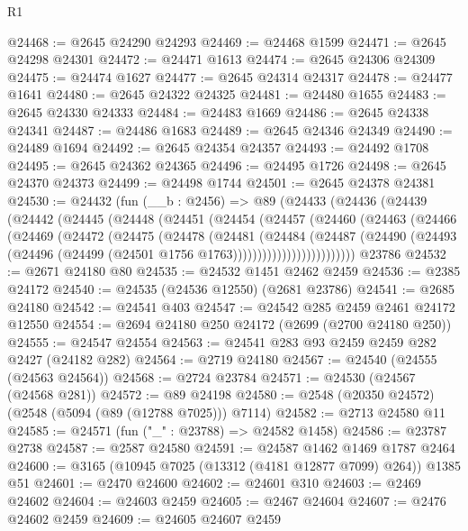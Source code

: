 \begin{lexlean}{R1}
\begin{coremodule}
@24468 := @2645 @24290 @24293
@24469 := @24468 @1599
@24471 := @2645 @24298 @24301
@24472 := @24471 @1613
@24474 := @2645 @24306 @24309
@24475 := @24474 @1627
@24477 := @2645 @24314 @24317
@24478 := @24477 @1641
@24480 := @2645 @24322 @24325
@24481 := @24480 @1655
@24483 := @2645 @24330 @24333
@24484 := @24483 @1669
@24486 := @2645 @24338 @24341
@24487 := @24486 @1683
@24489 := @2645 @24346 @24349
@24490 := @24489 @1694
@24492 := @2645 @24354 @24357
@24493 := @24492 @1708
@24495 := @2645 @24362 @24365
@24496 := @24495 @1726
@24498 := @2645 @24370 @24373
@24499 := @24498 @1744
@24501 := @2645 @24378 @24381
@24530 := @24432
    (fun (__b : @2456) =>
    @89
      (@24433
        (@24436
          (@24439
            (@24442
              (@24445
                (@24448
                  (@24451
                    (@24454
                      (@24457
                        (@24460
                          (@24463
                            (@24466
                              (@24469
                                (@24472
                                  (@24475
                                    (@24478
                                      (@24481
                                        (@24484
                                          (@24487
                                            (@24490
                                              (@24493
                                                (@24496
                                                  (@24499
                                                    (@24501 @1756 @1763)))))))))))))))))))))))))
    @23786
@24532 := @2671 @24180 @80
@24535 := @24532 @1451 @2462 @2459
@24536 := @2385 @24172
@24540 := @24535 (@24536 @12550) (@2681 @23786)
@24541 := @2685 @24180
@24542 := @24541 @403
@24547 := @24542 @285 @2459 @2461 @24172 @12550
@24554 := @2694 @24180 @250 @24172 (@2699 (@2700 @24180 @250))
@24555 := @24547 @24554
@24563 := @24541 @283 @93 @2459 @2459 @282 @2427 (@24182 @282)
@24564 := @2719 @24180
@24567 := @24540 (@24555 (@24563 @24564))
@24568 := @2724 @23784
@24571 := @24530 (@24567 (@24568 @281))
@24572 := @89 @24198
@24580 := @2548 (@20350 @24572) (@2548 (@5094 (@89 (@12788 @7025))) @7114)
@24582 := @2713 @24580 @11
@24585 := @24571 (fun ("_" : @23788) => @24582 @1458)
@24586 := @23787 @2738
@24587 := @2587 @24580
@24591 := @24587 @1462 @1469 @1787 @2464
@24600 := @3165 (@10945 @7025 (@13312 (@4181 @12877 @7099) @264)) @1385 @51
@24601 := @2470 @24600
@24602 := @24601 @310
@24603 := @2469 @24602
@24604 := @24603 @2459
@24605 := @2467 @24604
@24607 := @2476 @24602 @2459
@24609 := @24605 @24607 @2459

\end{coremodule}
\end{lexlean}
